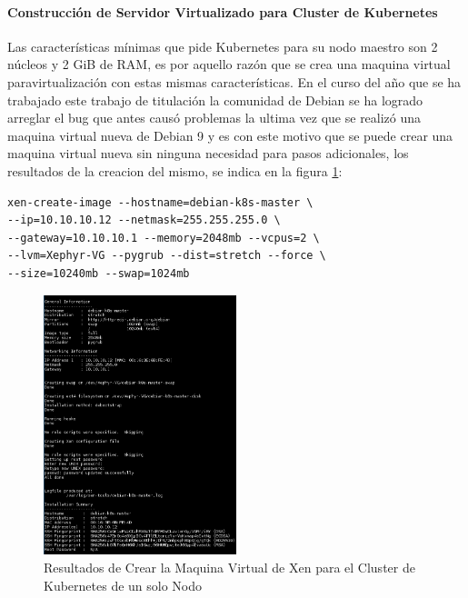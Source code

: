 \paragraph{Construcción de Servidor Virtualizado para Cluster de Kubernetes}
Las características mínimas que pide Kubernetes para su nodo maestro son 2 núcleos y 2 GiB de RAM, es por aquello razón que se crea una maquina virtual paravirtualización con estas mismas características. En el curso del año que se ha trabajado este trabajo de titulación la comunidad de Debian se ha logrado arreglar  el bug que antes causó problemas la ultima vez que se realizó una maquina virtual nueva de Debian 9 y es con este motivo que se puede crear una maquina virtual nueva sin ninguna necesidad para pasos adicionales, los resultados de la creacion del mismo, se indica en la figura \ref{fig:create-k8s-xen-vm}:
\begin{lstlisting}
xen-create-image --hostname=debian-k8s-master \
--ip=10.10.10.12 --netmask=255.255.255.0 \
--gateway=10.10.10.1 --memory=2048mb --vcpus=2 \
--lvm=Xephyr-VG --pygrub --dist=stretch --force \
--size=10240mb --swap=1024mb
\end{lstlisting}
\begin{figure}
	\begin{center}
		\includegraphics[width=0.5\textwidth]{Figures/create-k8s-vm.png}
	\end{center}
    \caption{Resultados de Crear la Maquina Virtual de Xen para el Cluster de Kubernetes de un solo Nodo}
    \label{fig:create-k8s-xen-vm}
\end{figure}

\index{Docker}
